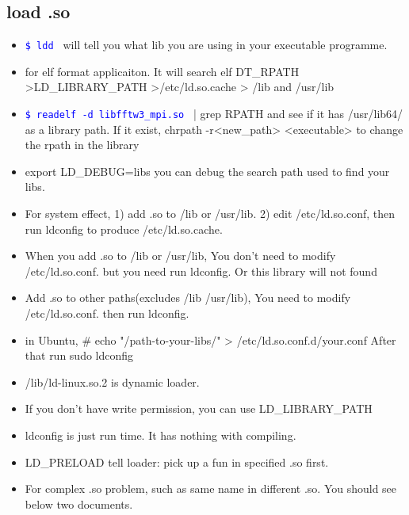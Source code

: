\documentclass[a4paper,12pt,twoside]{book}
\newcommand{\linuxcommand}[1]{\texttt{\textcolor{blue}{\$ #1 \Pisymbol{psy}{191}}}}
\begin{document}
\subsection{load .so}

		\begin{itemize}
  		 \item \linuxcommand{ldd} will tell you what lib you are using in your executable programme.

				\item for elf format applicaiton. It will search elf DT\_RPATH >LD\_LIBRARY\_PATH >/etc/ld.so.cache > /lib and /usr/lib

				\item \linuxcommand{readelf -d libfftw3\_mpi.so} | grep RPATH and see if it has /usr/lib64/ as a library path. If it exist, chrpath -r<new\_path> <executable> to change the rpath in the library 

				\item export LD\_DEBUG=libs you can debug the search path used to find your libs.

				\item For system effect, 1) add .so to /lib or /usr/lib. 2) edit /etc/ld.so.conf, then run ldconfig to produce /etc/ld.so.cache.

				\item When you add .so to /lib or /usr/lib, You don't need to modify /etc/ld.so.conf. but you need run ldconfig.  Or this library will not found 

				\item Add .so to other paths(excludes /lib /usr/lib), You need to modify /etc/ld.so.conf. then run ldconfig. 
				
				\item in Ubuntu, \# echo "/path-to-your-libs/" > /etc/ld.so.conf.d/your.conf After that run sudo ldconfig
						
				\item /lib/ld-linux.so.2 is dynamic loader. 

				\item If you don't have write permission, you can use LD\_LIBRARY\_PATH

				\item ldconfig is just run time. It has nothing with compiling. 

				\item LD\_PRELOAD tell loader: pick up a fun in specified .so first. 

				\item For complex .so problem, such as same name in different .so.  You should see below two documents. 


\end{itemize}
\end{document}
